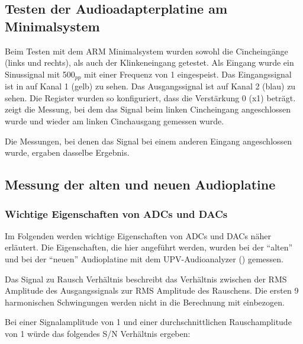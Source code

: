 
\subsection{Testen der Audioadapterplatine am \gls{Minimalsystem}}
Beim Testen mit dem \gls{ARM} \gls{Minimalsystem} wurden sowohl die Cincheingänge (links und rechts), als auch der Klinkeneingang getestet. Als Eingang wurde ein Sinussignal mit \unit{500}{\milli\volt}$_{pp}$ mit einer Frequenz von \unit{1}{\kilo\hertz} eingespeist. Das Eingangssignal ist in  auf Kanal 1 (gelb) zu sehen. Das Ausgangssignal ist auf Kanal 2 (blau) zu sehen. Die Register wurden so konfiguriert, dass die Verstärkung \unit{0}{\deci\bel} (x1) beträgt.  zeigt die Messung, bei dem das Signal beim linken Cincheingang angeschlossen wurde und wieder am linken Cinchausgang gemessen wurde.


Die Messungen, bei denen das Signal bei einem anderen Eingang angeschlossen wurde, ergaben dasselbe Ergebnis.

\subsection{Messung der alten und neuen Audioplatine}
\subsubsection{Wichtige Eigenschaften von ADCs und DACs}
Im Folgenden werden wichtige Eigenschaften von \gls{ADC}s und \gls{DAC}s näher erläutert. Die Eigenschaften, die hier angeführt werden, wurden bei der \enquote{alten} und bei der \enquote{neuen} Audioplatine mit dem UPV-Audioanalyzer () gemessen.

Das Signal zu Rausch Verhältnis beschreibt das Verhältnis zwischen der RMS Amplitude des Ausgangssignals zur RMS Amplitude des Rauschens. Die ersten 9 harmonischen Schwingungen werden nicht in die Berechnung mit einbezogen.


Bei einer Signalamplitude von \unit{1}{\volt} und einer durchschnittlichen Rauschamplitude von \unit{1}{\milli\volt} würde das folgendes S/N Verhältnis ergeben:

